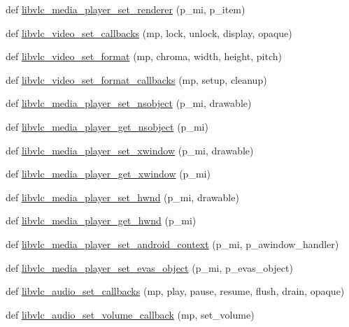 \begin{DoxyCompactItemize}
\item 
def \hyperlink{namespacevlc_af049b733fbfa570005d2cb436dc7edf1}{libvlc\+\_\+media\+\_\+player\+\_\+set\+\_\+renderer} (p\+\_\+mi, p\+\_\+item)
\item 
def \hyperlink{namespacevlc_abbf3342ec38822cac666ab799e12c0e0}{libvlc\+\_\+video\+\_\+set\+\_\+callbacks} (mp, lock, unlock, display, opaque)
\item 
def \hyperlink{namespacevlc_acb41fcc3e8fb44271b3af9cfa0899473}{libvlc\+\_\+video\+\_\+set\+\_\+format} (mp, chroma, width, height, pitch)
\item 
def \hyperlink{namespacevlc_a285e546903b5f0a9e27beb4d2763dab3}{libvlc\+\_\+video\+\_\+set\+\_\+format\+\_\+callbacks} (mp, setup, cleanup)
\item 
def \hyperlink{namespacevlc_aaf2252c49a6e14c5fbcab04065b8b6f5}{libvlc\+\_\+media\+\_\+player\+\_\+set\+\_\+nsobject} (p\+\_\+mi, drawable)
\item 
def \hyperlink{namespacevlc_ac916d9f7b58a94ee7e081b110bb983fc}{libvlc\+\_\+media\+\_\+player\+\_\+get\+\_\+nsobject} (p\+\_\+mi)
\item 
def \hyperlink{namespacevlc_a9f137196660c7428467e8275ebebe8b6}{libvlc\+\_\+media\+\_\+player\+\_\+set\+\_\+xwindow} (p\+\_\+mi, drawable)
\item 
def \hyperlink{namespacevlc_a9d0e29b3ab21c037abe445f60d224ae9}{libvlc\+\_\+media\+\_\+player\+\_\+get\+\_\+xwindow} (p\+\_\+mi)
\item 
def \hyperlink{namespacevlc_a7b6f415070dbcd8fc7e50311853bbb26}{libvlc\+\_\+media\+\_\+player\+\_\+set\+\_\+hwnd} (p\+\_\+mi, drawable)
\item 
def \hyperlink{namespacevlc_a30619d7bd21f38cf0e01306c37635269}{libvlc\+\_\+media\+\_\+player\+\_\+get\+\_\+hwnd} (p\+\_\+mi)
\item 
def \hyperlink{namespacevlc_ae9303e0d1bd96d748e62523a28d6c391}{libvlc\+\_\+media\+\_\+player\+\_\+set\+\_\+android\+\_\+context} (p\+\_\+mi, p\+\_\+awindow\+\_\+handler)
\item 
def \hyperlink{namespacevlc_a1ba42eb92d2829216be25aa31ec8982d}{libvlc\+\_\+media\+\_\+player\+\_\+set\+\_\+evas\+\_\+object} (p\+\_\+mi, p\+\_\+evas\+\_\+object)
\item 
def \hyperlink{namespacevlc_a8edc679f928c8870c5412270fea57b6c}{libvlc\+\_\+audio\+\_\+set\+\_\+callbacks} (mp, play, pause, resume, flush, drain, opaque)
\item 
def \hyperlink{namespacevlc_a304ceaa4a56a980bf12623e54edd3444}{libvlc\+\_\+audio\+\_\+set\+\_\+volume\+\_\+callback} (mp, set\+\_\+volume)

\end{DoxyCompactItemize}
